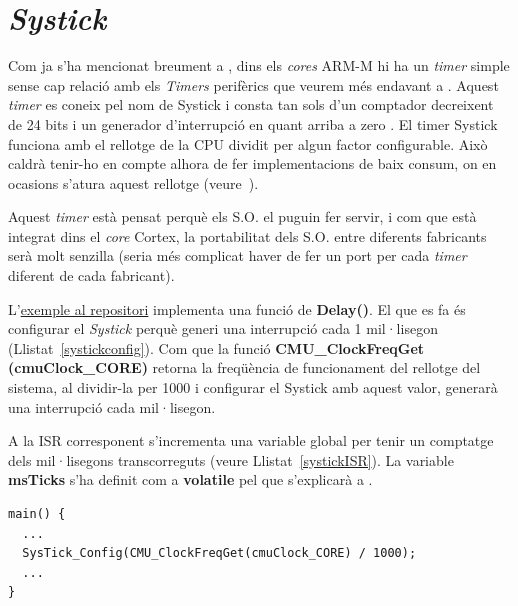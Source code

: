 \section{{\em Systick}}
\label{sec:systick}
Com ja s'ha mencionat breument a , dins els {\em cores} ARM-M hi ha un {\em timer} simple sense cap relació amb els {\em Timers} perifèrics que veurem més endavant a . Aquest {\em timer} es coneix pel nom de \gls{Systick} i consta tan sols d'un comptador decreixent de 24 bits i un generador d'interrupció en quant arriba a zero \cite[312]{GuideCortexM3M4}. El timer Systick funciona amb el rellotge de la CPU dividit per algun factor configurable. Això caldrà tenir-ho en compte alhora de fer implementacions de baix consum, on en ocasions s'atura aquest rellotge (veure~).

Aquest {\em timer} està pensat perquè els S.O. el puguin fer servir, i com que està integrat dins el {\em core} Cortex, la portabilitat dels S.O. entre diferents fabricants serà molt senzilla (seria més complicat haver de fer un port per cada {\em timer} diferent de cada fabricant).

L'\href{https://github.com/mariusmm/cursembedded/tree/master/Simplicity/Systick}{exemple al repositori} implementa una funció de {\bf Delay()}. El que es fa és configurar el {\em Systick} perquè generi una interrupció cada 1 mil·lisegon (Llistat~\ref{systickconfig}). Com que la funció {\bf CMU\_ClockFreqGet\\(cmuClock\_CORE)} retorna la freqüència de funcionament del rellotge del sistema, al dividir-la per 1000 i configurar el Systick amb aquest valor, generarà una interrupció cada mil·lisegon.

A la ISR corresponent s'incrementa una variable global per tenir un comptatge dels mil·lisegons transcorreguts (veure Llistat~\ref{systickISR}). La variable {\bf msTicks} s'ha definit com a {\bf volatile} pel que s'explicarà a .

\begin{lstlisting}[caption={Configuració del {\em Systick}},style=customc,label=systickconfig]
main() {
  ...
  SysTick_Config(CMU_ClockFreqGet(cmuClock_CORE) / 1000);
  ...
}
\end{lstlisting}

